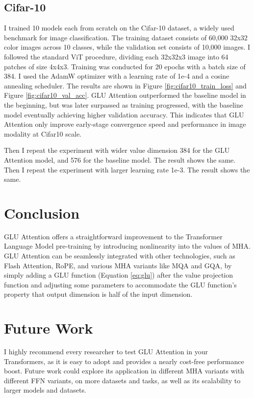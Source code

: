 \documentclass[11pt]{article}
\begin{document}
\subsection{Cifar-10}

I trained 10 models each from scratch on the Cifar-10 dataset, a widely used benchmark for image classification. The training dataset consists of 60,000 32x32 color images across 10 classes, while the validation set consists of 10,000 images. I followed the standard ViT\cite{dosovitskiy2021imageworth16x16words} procedure, dividing each 32x32x3 image into 64 patches of size 4x4x3. Training was conducted for 20 epochs with a batch size of 384. I used the AdamW optimizer with a learning rate of 1e-4 and a cosine annealing scheduler. The results are shown in Figure \ref{fig:cifar10_train_loss} and Figure \ref{fig:cifar10_val_acc}. GLU Attention outperformed the baseline model in the beginning, but was later surpassed as training progressed, with the baseline model eventually achieving higher validation accuracy. This indicates that GLU Attention only improve early-stage convergence speed and performance in image modality at Cifar10 scale.

Then I repeat the experiment with wider value dimension 384 for the GLU Attention model, and 576 for the baseline model. The result shows the same. Then I repeat the experiment with larger learning rate 1e-3. The result shows the same.

\section{Conclusion}

GLU Attention offers a straightforward improvement to the Transformer Language Model pre-training by introducing nonlinearity into the values of MHA. GLU Attention can be seamlessly integrated with other technologies, such as Flash Attention\cite{dao2022flashattentionfastmemoryefficientexact}, RoPE\cite{su2023roformerenhancedtransformerrotary}, and various MHA variants like MQA and GQA\cite{ainslie2023gqatraininggeneralizedmultiquery}, by simply adding a GLU function (Equation \ref{eq:glu}) after the value projection function and adjusting some parameters to accommodate the GLU function's property that output dimension is half of the input dimension.

\section{Future Work}
I highly recommend every researcher to test GLU Attention in your Transformers, as it is easy to adopt and provides a nearly cost-free performance boost. Future work could explore its application in different MHA variants with different FFN variants, on more datasets and tasks, as well as its scalability to larger models and datasets.



\end{document}
